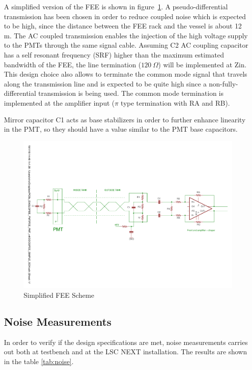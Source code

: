 \documentclass[a4paper, 10pt, oneside, twocolumn, 3p]{elsarticle}
\begin{document}
\par   A simplified version of the FEE is shown in figure~\ref{fig:FEE_scheme}. A pseudo-differential transmission has been chosen in order to reduce coupled noise which is expected to be high, since the distance between the FEE rack and the vessel is about 12 m. The AC coupled transmission enables the injection of the high voltage supply to the PMTs through the same signal cable. Assuming C2 AC coupling capacitor has a self resonant frequency (SRF) higher than the maximum estimated bandwidth of the FEE,  the line termination ($120~\Omega$) will be implemented at Zin. This design choice also allows to terminate the common mode signal that travels along the transmission line and is expected to be quite high since a non-fully-differential transmission is being used. The common mode termination is implemented at the amplifier input ($\pi$ type termination with RA and RB).

\par Mirror capacitor C1 acts as base stabilizers in order to further enhance linearity in the PMT, so they should have a value similar to the PMT base capacitors.


\begin{figure}
	\begin{center}
		\includegraphics[width=.55\textwidth]{./figures/FEE_simple_scheme.pdf}
		\caption{Simplified FEE Scheme}
		\label{fig:FEE_scheme}
	\end{center}
\end{figure}


\subsection{Noise Measurements}
In order to verify if the design specifications are met, noise measurements carries out both at testbench and at the LSC NEXT installation. The results are shown in the table \ref{tab:noise}. 
\end{document}
